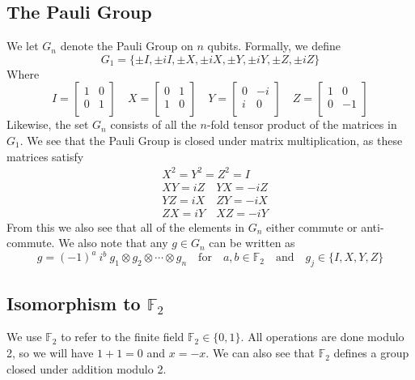 \documentclass[11pt]{article}
\theoremstyle{definition}
\theoremstyle{plain}
\begin{document}
\subsection{The Pauli Group}
We let $G_n$ denote the Pauli Group on $n$ qubits. Formally, we define \begin{equation}
  G_1 = \{ \pm I, \pm i I, \pm X, \pm iX, \pm Y, \pm i Y, \pm Z, \pm i Z \}
\end{equation}
Where 
\begin{equation}
I = 
\begin{bmatrix}
  1 & 0 \\
  0 & 1 \\ 
\end{bmatrix} \quad 
X = 
\begin{bmatrix}
  0 & 1 \\
  1 & 0 \\ 
\end{bmatrix} \quad 
Y =   
\begin{bmatrix}
  0 & -i \\
  i & 0 \\ 
\end{bmatrix} \quad 
Z =  
\begin{bmatrix}
  1 & 0 \\
  0 & -1 \\ 
\end{bmatrix}
\end{equation}
Likewise, the set $G_n$ consists of all the $n$-fold tensor product of the matrices in $G_1$. We see that the Pauli Group is closed under matrix multiplication, as these matrices satisfy 
\begin{align}
  & X^2 = Y^2 = Z^2 = I \label{pauli_1}\\
  & XY = iZ \quad YX = -iZ \\
  & YZ = iX \quad ZY = -iX \\
  & ZX = iY \quad XZ = -iY \label{pauli_3}
\end{align}
From this we also see that all of the elements in $G_n$ either commute or anti-commute. We also note that any $g \in G_n$ can be written as
\begin{equation}\label{pauli_2}
  g = {(-1)}^a \ i^b \ g_1 \otimes g_2 \otimes \cdots \otimes
  g_n \quad \text{for} \quad a, b \in \mathbb{F}_2 \quad \text{and} \quad
  g_j \in \{ I, X, Y, Z \} 
\end{equation}

\subsection{Isomorphism to $\mathbb{F}_2$}
We use $\mathbb{F}_2$ to refer to the finite field $\mathbb{F}_2 \in \{0, 1\}$. All operations are done modulo 2, so we will have $1 + 1 = 0$ and $x = -x$. We can also see that $\mathbb{F}_2$ defines a group closed under addition modulo 2.
\end{document}
